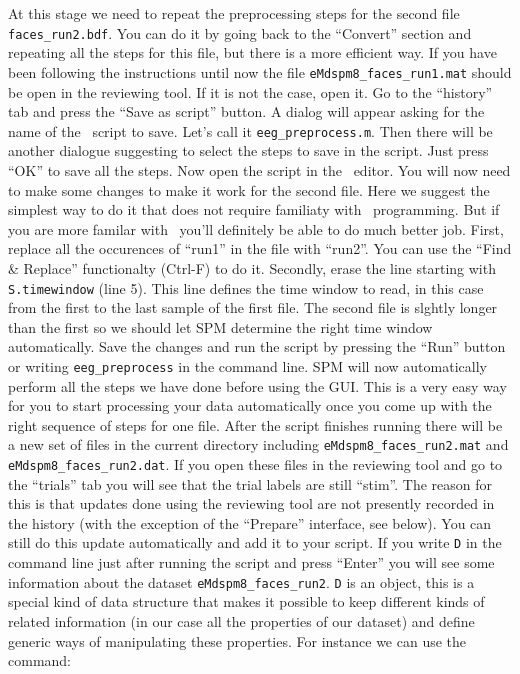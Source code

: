 At this stage we need to repeat the preprocessing steps for the second file \texttt{faces\_run2.bdf}. You can do it by going back to the ``Convert'' section and repeating all the steps for this file, but there is a more efficient way. If you have been following the instructions until now the file \texttt{eMdspm8\_faces\_run1.mat} should be open in the reviewing tool. If it is not the case, open it. Go to the ``history'' tab and press the ``Save as script'' button. A dialog will appear asking for the name of the \matlab\ script to save. Let's call it \texttt{eeg\_preprocess.m}. Then there will be another dialogue suggesting to select the steps to save in the script. Just press ``OK'' to save all the steps. Now open the script in the \matlab\ editor. You will now need to make some changes to make it work for the second file. Here we suggest the simplest way to do it that does not require familiaty with \matlab\ programming. But if you are more familar with \matlab\ you'll definitely be able to do much better job. First, replace all the occurences of ``run1'' in the file with ``run2''. You can use the ``Find \& Replace'' functionalty (Ctrl-F) to do it. Secondly, erase the line starting with \texttt{S.timewindow} (line 5). This line defines the time window to read, in this case from the first to the last sample of the first file. The second file is slghtly longer than the first so we should let SPM determine the right time window automatically. Save the changes and run the script by pressing the ``Run'' button or writing \texttt{eeg\_preprocess} in the command line. SPM will now automatically perform all the steps we have done before using the GUI. This is a very easy way for you to start processing your data automatically once you come up with the right sequence of steps for one file. After the script finishes running there will be a new set of files in the current directory including \texttt{eMdspm8\_faces\_run2.mat} and \texttt{eMdspm8\_faces\_run2.dat}. If you open these files in the reviewing tool and go to the ``trials'' tab you will see that the trial labels are still ``stim''. The reason for this is that updates done using the reviewing tool are not presently recorded in the history (with the exception of the ``Prepare'' interface, see below). You can still do this update automatically and add it to your script. If you write \texttt{D} in the command line just after running the script and press ``Enter'' you will see some information about the dataset \texttt{eMdspm8\_faces\_run2}. \texttt{D} is an object, this is a special kind of data structure that makes it possible to keep different kinds of related information (in our case all the properties of our dataset) and define generic ways of manipulating these properties. For instance we can use the command:

